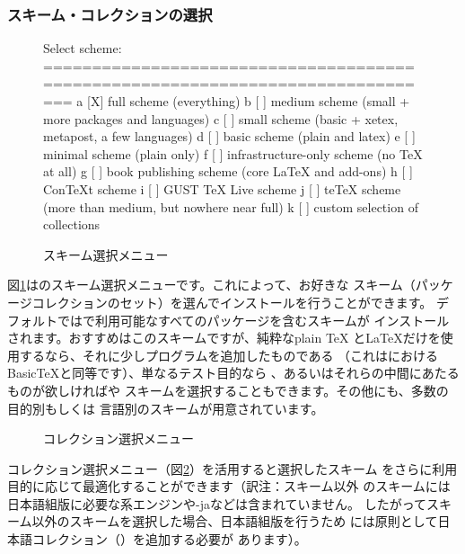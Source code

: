 \documentclass[uplatex,dvipdfmx]{jsarticle}
\begin{document}
\subsubsection{スキーム・コレクションの選択}
\label{sec:components}

\begin{figure}[tbh]
\begin{boxedverbatim}
Select scheme:
===============================================================================
 a [X] full scheme (everything)
 b [ ] medium scheme (small + more packages and languages)
 c [ ] small scheme (basic + xetex, metapost, a few languages)
 d [ ] basic scheme (plain and latex)
 e [ ] minimal scheme (plain only)
 f [ ] infrastructure-only scheme (no TeX at all)
 g [ ] book publishing scheme (core LaTeX and add-ons)
 h [ ] ConTeXt scheme
 i [ ] GUST TeX Live scheme
 j [ ] teTeX scheme (more than medium, but nowhere near full)
 k [ ] custom selection of collections
\end{boxedverbatim}
\vspace{-1zh}
\caption{スキーム選択メニュー}\label{fig:scheme-text}
\end{figure}

図\ref{fig:scheme-text}は\TL のスキーム選択メニューです。これによって、お好きな
スキーム（パッケージコレクションのセット）を選んでインストールを行うことができます。
デフォルトでは\TL で利用可能なすべてのパッケージを含むスキームが
インストールされます。おすすめはこのスキームですが、純粋なplain \TeX
と\LaTeX だけを使用するなら、それに少しプログラムを追加したものである
（これは\MacTeX におけるBasic\TeX と同等です）、単なるテスト目的なら
、あるいはそれらの中間にあたるものが欲しければや
スキームを選択することもできます。その他にも、多数の目的別もしくは
言語別のスキームが用意されています。

\begin{figure}[tb]
\centering {}
\caption{コレクション選択メニュー}\label{fig:collections-gui}
\end{figure}

コレクション選択メニュー（図\ref{fig:collections-gui}）を活用すると選択したスキーム
をさらに利用目的に応じて最適化することができます（訳注：スキーム以外
のスキームには日本語組版に必要な\pTeX 系エンジンや\LuaTeX-jaなどは含まれていません。
したがってスキーム以外のスキームを選択した場合、日本語組版を行うため
には原則として日本語コレクション（）を追加する必要が
あります）。
\end{document}
